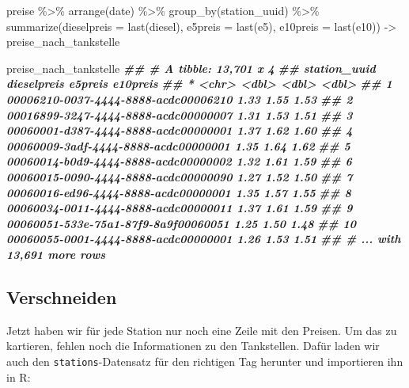 \documentclass[
  ngerman,
]{article}
\newenvironment{Shaded}{\begin{snugshade}}{\end{snugshade}}
\newcommand{\AttributeTok}[1]{\textcolor[rgb]{0.77,0.63,0.00}{#1}}
\newcommand{\DocumentationTok}[1]{\textcolor[rgb]{0.56,0.35,0.01}{\textbf{\textit{#1}}}}
\newcommand{\FunctionTok}[1]{\textcolor[rgb]{0.00,0.00,0.00}{#1}}
\newcommand{\NormalTok}[1]{#1}
\newcommand{\OtherTok}[1]{\textcolor[rgb]{0.56,0.35,0.01}{#1}}
\newcommand{\SpecialCharTok}[1]{\textcolor[rgb]{0.00,0.00,0.00}{#1}}
\begin{document}
\begin{Shaded}
\begin{Highlighting}[]
\NormalTok{preise }\SpecialCharTok{\%\textgreater{}\%}
  \FunctionTok{arrange}\NormalTok{(date) }\SpecialCharTok{\%\textgreater{}\%}
  \FunctionTok{group\_by}\NormalTok{(station\_uuid) }\SpecialCharTok{\%\textgreater{}\%}
  \FunctionTok{summarize}\NormalTok{(}\AttributeTok{dieselpreis =} \FunctionTok{last}\NormalTok{(diesel),}
            \AttributeTok{e5preis     =} \FunctionTok{last}\NormalTok{(e5),}
            \AttributeTok{e10preis    =} \FunctionTok{last}\NormalTok{(e10)) }\OtherTok{{-}\textgreater{}}
\NormalTok{  preise\_nach\_tankstelle}

\NormalTok{preise\_nach\_tankstelle}
\DocumentationTok{\#\# \# A tibble: 13,701 x 4}
\DocumentationTok{\#\#    station\_uuid                         dieselpreis e5preis e10preis}
\DocumentationTok{\#\#  * \textless{}chr\textgreater{}                                      \textless{}dbl\textgreater{}   \textless{}dbl\textgreater{}    \textless{}dbl\textgreater{}}
\DocumentationTok{\#\#  1 00006210{-}0037{-}4444{-}8888{-}acdc00006210        1.33    1.55     1.53}
\DocumentationTok{\#\#  2 00016899{-}3247{-}4444{-}8888{-}acdc00000007        1.31    1.53     1.51}
\DocumentationTok{\#\#  3 00060001{-}d387{-}4444{-}8888{-}acdc00000001        1.37    1.62     1.60}
\DocumentationTok{\#\#  4 00060009{-}3adf{-}4444{-}8888{-}acdc00000001        1.35    1.64     1.62}
\DocumentationTok{\#\#  5 00060014{-}b0d9{-}4444{-}8888{-}acdc00000002        1.32    1.61     1.59}
\DocumentationTok{\#\#  6 00060015{-}0090{-}4444{-}8888{-}acdc00000090        1.27    1.52     1.50}
\DocumentationTok{\#\#  7 00060016{-}ed96{-}4444{-}8888{-}acdc00000001        1.35    1.57     1.55}
\DocumentationTok{\#\#  8 00060034{-}0011{-}4444{-}8888{-}acdc00000011        1.37    1.61     1.59}
\DocumentationTok{\#\#  9 00060051{-}533e{-}75a1{-}87f9{-}8a9f00060051        1.25    1.50     1.48}
\DocumentationTok{\#\# 10 00060055{-}0001{-}4444{-}8888{-}acdc00000001        1.26    1.53     1.51}
\DocumentationTok{\#\# \# ... with 13,691 more rows}
\end{Highlighting}
\end{Shaded}

\hypertarget{verschneiden-1}{%
\subsection{Verschneiden}\label{verschneiden-1}}

Jetzt haben wir für jede Station nur noch eine Zeile mit den Preisen.
Um das zu kartieren, fehlen noch die Informationen zu den Tankstellen. Dafür laden wir auch den \texttt{stations}-Datensatz für den richtigen Tag herunter und importieren ihn in R:
\end{document}
